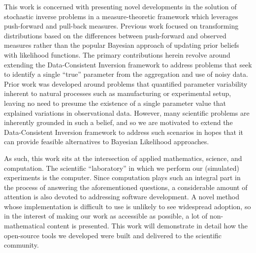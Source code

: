 This work is concerned with presenting novel developments in the solution of stochastic inverse problems in a measure-theoretic framework which leverages push-forward and pull-back measures.
Previous work focused on transforming distributions based on the differences between push-forward and observed measures rather than the popular Bayesian approach of updating prior beliefs with likelihood functions.
The primary contributions herein revolve around extending the Data-Consistent Inversion framework to address problems that seek to identify a single ``true'' parameter from the aggregation and use of noisy data. 
Prior work was developed around problems that quantified parameter variability inherent to natural processes such as manufacturing or experimental setup, leaving no need to presume the existence of a single parameter value that explained variations in observational data.
However, many scientific problems are inherently grounded in such a belief, and so we are motivated to extend the Data-Consistent Inversion framework to address such scenarios in hopes that it can provide feasible alternatives to Bayesian Likelihood approaches.

As such, this work sits at the intersection of applied mathematics, science, and computation.
The scientific ``laboratory'' in which we perform our (simulated) experiments is the computer. 
Since computation plays such an integral part in the process of answering the aforementioned questions, a considerable amount of attention is also devoted to addressing software development. 
A novel method whose implementation is difficult to use is unlikely to see widespread adoption, so in the interest of making our work as accessible as possible, a lot of non-mathematical content is presented.
This work will demonstrate in detail how the open-source tools we developed were built and delivered to the scientific community. 